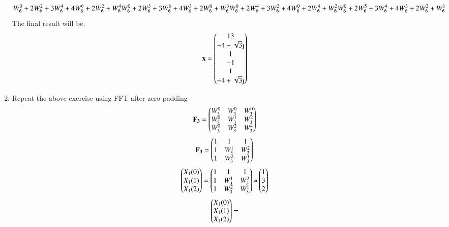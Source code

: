 \documentclass[journal,12pt,twocolumn]{IEEEtran}
\let\vec\mathbf
\renewcommand\thesection{\arabic{section}}
\begin{document}
\begin{enumerate}[label=\thesection.\arabic*]
\begin{equation}
{				W^{0}_{6} + 2W^{2}_{6} +  3W^{4}_{6} + 4W^{6}_{6} +  2W^{2}_{6} +  W^{4}_{6}\\
				W^{0}_{6} + 2W^{3}_{6} +  3W^{6}_{6} + 4W^{3}_{6} +  2W^{0}_{6} +  W^{3}_{6}\\
				W^{0}_{6} + 2W^{4}_{6} +  3W^{2}_{6} + 4W^{0}_{6} +  2W^{4}_{6} +  W^{2}_{6}\\
				W^{0}_{6} + 2W^{5}_{6} +  3W^{4}_{6} + 4W^{3}_{6} +  2W^{2}_{6} +  W^{1}_{6}
			}
		\end{equation}
		The final result will be.
		\begin{equation}
			\vec{x}=
			\myvec{
				13\\
				-4-\sqrt{3}\text{\j} \\
				1 \\
				-1 \\
				1 \\
				-4 + \sqrt{3}\text{\j}
			}
		\end{equation}
    \item Repeat the above exercise using
	    FFT after zero padding \\
		\solution
		\begin{equation}
			\vec{F_{3}} = 
			\myvec{
				W^{0}_{3} & W^{0}_{3} & W^{0}_{3}\\
				W^{0}_{3} & W^{1}_{3} & W^{2}_{3}\\
				W^{0}_{3} & W^{2}_{3} & W^{4}_{3}\\
			}
		\end{equation}
		\begin{equation}
			\vec{F_{3}} = 
			\myvec{
				1 & 1 & 1\\
				1 & W^{1}_{3} & W^{2}_{3}\\
				1 & W^{2}_{3} & W^{1}_{3}\\
			}
		\end{equation}
		\begin{equation}
			\begin{pmatrix}X_{1}(0)\\ X_{1}(1)\\ X_{1}(2)\end{pmatrix} = 
			\begin{pmatrix}
				1 & 1 & 1\\
				1 & W^{1}_{3} & W^{2}_{3}\\
				1 & W^{2}_{3} & W^{1}_{3}\\
			\end{pmatrix}
			*
			\begin{pmatrix}1\\ 3\\ 2\end{pmatrix}
		\end{equation}
		\begin{equation}
			\myvec{X_{1}(0)\\ X_{1}(1)\\ X_{1}(2)} = 

\end{equation}
\end{enumerate}
\end{document}
